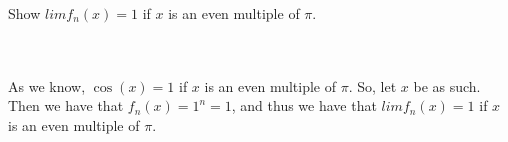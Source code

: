 Show $lim f_n(x)=1$ if $x$ is an even multiple of $\pi$.\\\\

\begin{solution}\renewcommand{\qedsymbol}{}\ \\
    As we know, $\cos(x)=1$ if $x$ is an even multiple of $\pi$. So, let $x$ be as such. Then we have
    that $f_n(x)=1^n=1$, and thus we have that $lim f_n(x)=1$ if $x$ is an even multiple of $\pi$.

\end{solution}